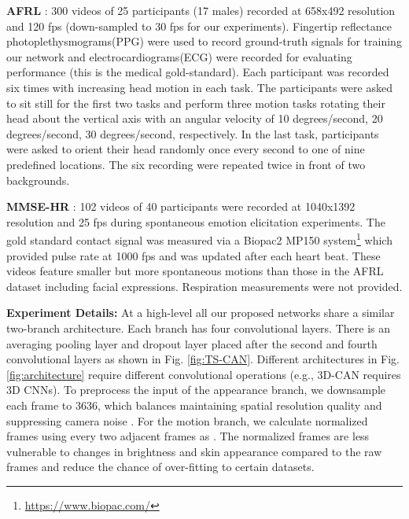 \documentclass{article}
\begin{document}
\textbf{AFRL} \citep{estepp2014recovering}: 300 videos of 25 participants (17 males) recorded at 658x492 resolution and 120 fps (down-sampled to 30 fps for our experiments). Fingertip reflectance photoplethysmograms(PPG) were used to record ground-truth signals for training our network and electrocardiograms(ECG) were recorded for evaluating performance (this is the medical gold-standard). Each participant was recorded six times with increasing head motion in each task. The participants were asked to sit still for the first two tasks and perform three motion tasks rotating their head about the vertical axis with an angular velocity of 10 degrees/second, 20 degrees/second, 30 degrees/second, respectively. In the last task, participants were asked to orient their head randomly once every second to one of nine predefined locations. The six recording were repeated twice in front of two backgrounds.

\textbf{MMSE-HR} \citep{zhang2016multimodal}: 102 videos of 40 participants were recorded at 1040x1392 resolution and 25 fps during spontaneous emotion elicitation experiments. The gold standard contact signal was measured via a Biopac2 MP150 system\footnote{\url{https://www.biopac.com/}} which provided pulse rate at 1000 fps and was updated after each heart beat. These videos feature smaller but more spontaneous motions than those in the AFRL dataset including facial expressions. Respiration measurements were not provided.

\textbf{Experiment Details:} At a high-level all our proposed networks share a similar two-branch architecture. Each branch has four convolutional layers. There is an averaging pooling layer and dropout layer placed after the second and fourth convolutional layers as shown in Fig. \ref{fig:TS-CAN}. Different architectures in Fig. \ref{fig:architecture} require different convolutional operations (e.g., 3D-CAN requires 3D CNNs). To preprocess the input of the appearance branch, we downsample each frame  to 3636, which balances maintaining spatial resolution quality and suppressing camera noise \citep{wang2014exploiting}. For the motion branch, we calculate normalized frames using every two adjacent frames as . The normalized frames are less vulnerable to changes in brightness and skin appearance compared to the raw frames  and reduce the chance of over-fitting to certain datasets. 
\end{document}
